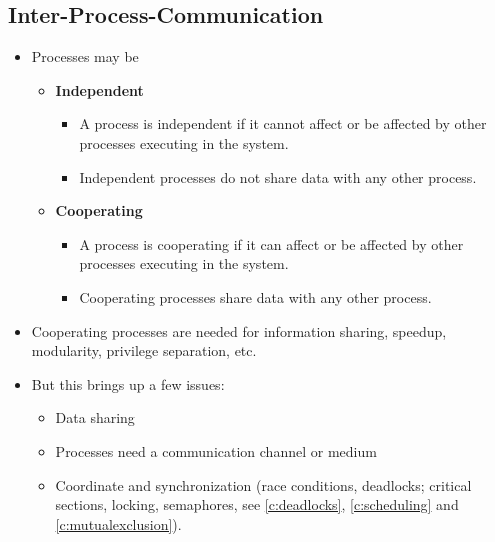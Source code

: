\documentclass[a4paper, 11pt, accentcolor = tud3b]{tudreport}
\begin{document}
            \subsection{Inter-Process-Communication}
                \begin{itemize}
                	\item Processes may be
	                	\begin{itemize}
	                		\item \textbf{Independent}
		                		\begin{itemize}
		                			\item A process is independent if it cannot affect or be affected by other processes executing in the system.
		                			\item Independent processes do not share data with any other process.
		                		\end{itemize}
	                		\item \textbf{Cooperating}
		                		\begin{itemize}
		                			\item A process is cooperating if it can affect or be affected by other processes executing in the system.
		                			\item Cooperating processes share data with any other process.
		                		\end{itemize}
	                	\end{itemize}
                	\item Cooperating processes are needed for information sharing, speedup, modularity, privilege separation, etc.
                	\item But this brings up a few issues:
	                	\begin{itemize}
	                		\item Data sharing
	                		\item Processes need a communication channel or medium
	                		\item Coordinate and synchronization (race conditions, deadlocks; critical sections, locking, semaphores, see \ref{c:deadlocks}, \ref{c:scheduling} and \ref{c:mutualexclusion}).
	                	\end{itemize}
                \end{itemize}
\end{document}
